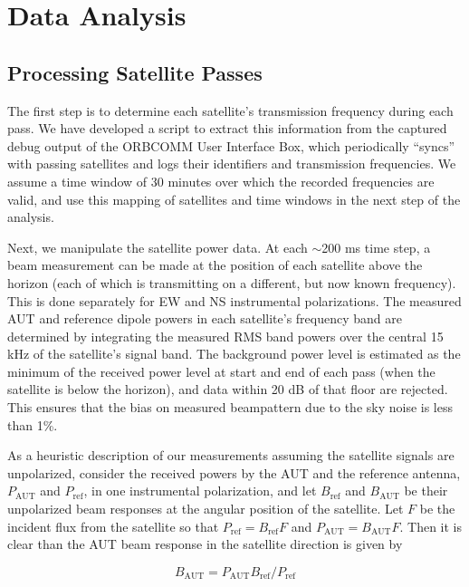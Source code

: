 \section{Data Analysis}
\label{sec:analysis}
\subsection{Processing Satellite Passes}
\label{sec:processingsatellitepasses}
The first step is to determine each satellite's transmission frequency during each pass. We have developed a script to extract this information from the captured debug output of the ORBCOMM User Interface Box, which periodically ``syncs'' with passing satellites and logs their identifiers and transmission frequencies. We assume a time window of 30 minutes over which the recorded frequencies are valid, and use this mapping of satellites and time windows in the next step of the analysis.

Next, we manipulate the satellite power data. At each $\sim$200 ms time step, a beam measurement can be made at the position of each satellite above the horizon (each of which is transmitting on a different, but now known frequency). This is done separately for EW and NS instrumental polarizations. The measured AUT and reference dipole powers in each satellite's frequency band are determined by integrating the measured RMS band powers over the central 15 kHz of the satellite's signal band. The background power level is estimated as the minimum of the received power level at start and end of each pass (when the satellite is below the horizon), and data within 20 dB of that floor are rejected. This ensures that the bias on measured beampattern due to the sky noise is less than 1\%. 

As a heuristic description of our measurements assuming the satellite signals are unpolarized, consider the received powers by the AUT and the reference antenna, $P_\mathrm{AUT}$ and $P_\mathrm{ref}$, in one instrumental polarization, and let $B_\mathrm{ref}$ and $B_\mathrm{AUT}$ be their unpolarized beam responses at the angular position of the satellite. Let $F$ be the incident flux from the satellite so that $P_\mathrm{ref}=B_\mathrm{ref}F$ and $P_\mathrm{AUT}=B_\mathrm{AUT}F$. Then it is clear than the AUT beam response in the satellite direction is given by

 \begin{equation}
\label{eqn:beammeasurement}
B_\mathrm{AUT}=P_\mathrm{AUT}B_\mathrm{ref}/P_\mathrm{ref}
\end{equation}

